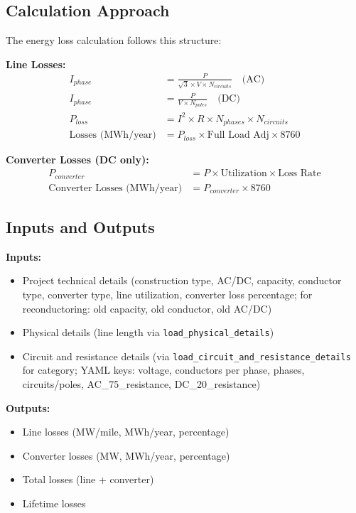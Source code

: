 \documentclass[ctcc_full_documentation.tex]{subfiles}
\begin{document}
\subsection{Calculation Approach}

The energy loss calculation follows this structure:

\textbf{Line Losses:}
\begin{align}
I_{phase} &= \frac{P}{\sqrt{3} \times V \times N_{circuits}} \quad \text{(AC)} \\
I_{phase} &= \frac{P}{V \times N_{poles}} \quad \text{(DC)} \\
P_{loss} &= I^2 \times R \times N_{phases} \times N_{circuits} \\
\text{Losses (MWh/year)} &= P_{loss} \times \text{Full Load Adj} \times 8760
\end{align}

\textbf{Converter Losses (DC only):}
\begin{align}
P_{converter} &= P \times \text{Utilization} \times \text{Loss Rate} \\
\text{Converter Losses (MWh/year)} &= P_{converter} \times 8760
\end{align}

\subsection{Inputs and Outputs}

\textbf{Inputs:}
\begin{itemize}
    \item Project technical details (construction type, AC/DC, capacity, conductor type, converter type, line utilization, converter loss percentage; for reconductoring: old capacity, old conductor, old AC/DC)
    \item Physical details (line length via \texttt{load\_physical\_details})
    \item Circuit and resistance details (via \texttt{load\_circuit\_and\_resistance\_details} for category; YAML keys: voltage, conductors per phase, phases, circuits/poles, AC\_75\_resistance, DC\_20\_resistance)
\end{itemize}

\textbf{Outputs:}
\begin{itemize}
    \item Line losses (MW/mile, MWh/year, percentage)
    \item Converter losses (MW, MWh/year, percentage)
    \item Total losses (line + converter)
    \item Lifetime losses
\end{itemize}
\end{document}
